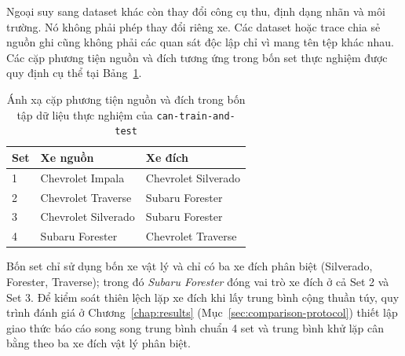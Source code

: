 \documentclass[12pt, a4paper, reqno, oneside]{book}
\begin{document}
Ngoại suy sang dataset khác còn thay đổi công cụ thu, định dạng nhãn và môi trường. Nó không phải phép thay đổi riêng xe. Các dataset hoặc trace chia sẻ nguồn ghi cũng không phải các quan sát độc lập chỉ vì mang tên tệp khác nhau. Các cặp phương tiện nguồn và đích tương ứng trong bốn set thực nghiệm được quy định cụ thể tại Bảng~\ref{tab:vehicle_pairs}.

\begin{table}[htbp]\centering
\caption[Ánh xạ cặp phương tiện nguồn và đích trong bốn tập dữ liệu]{Ánh xạ cặp phương tiện nguồn và đích trong bốn tập dữ liệu thực nghiệm của \texttt{can-train-and-test}}\label{tab:vehicle_pairs}
\begin{tabular}{lll}\toprule Set & Xe nguồn & Xe đích\\\midrule
1 & Chevrolet Impala & Chevrolet Silverado\\
2 & Chevrolet Traverse & Subaru Forester\\
3 & Chevrolet Silverado & Subaru Forester\\
4 & Subaru Forester & Chevrolet Traverse\\\bottomrule\end{tabular}
\end{table}

Bốn set chỉ sử dụng bốn xe vật lý và chỉ có ba xe đích phân biệt (Silverado, Forester, Traverse); trong đó \textit{Subaru Forester} đóng vai trò xe đích ở cả Set 2 và Set 3. Để kiểm soát thiên lệch lặp xe đích khi lấy trung bình cộng thuần túy, quy trình đánh giá ở Chương~\ref{chap:results} (Mục~\ref{sec:comparison-protocol}) thiết lập giao thức báo cáo song song trung bình chuẩn 4 set và trung bình khử lặp cân bằng theo ba xe đích vật lý phân biệt.
\end{document}
